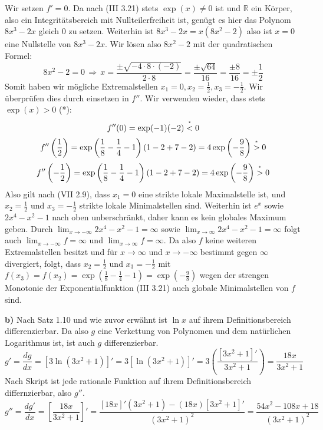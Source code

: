 \documentclass[a4paper,graphics,11pt]{article}
\newcommand{\up}[2]{\mathrel{\overset{\makebox[0pt]{\mbox{\normalfont\tiny #2}}}{#1}}}
\begin{document}
Wir setzen $f'=0$. Da nach (III 3.21) stets $\exp(x) \neq 0$ ist und $\mathbb{R}$ ein Körper,
also ein Integritätsbereich mit Nullteilerfreiheit ist, genügt es hier das Polynom
$8x^3-2x$ gleich 0 zu setzen. Weiterhin ist $8x^3-2x = x(8x^2-2)$ also ist $x=0$ eine
Nullstelle von $8x^3-2x$. Wir lösen also $8x^2-2$ mit der quadratischen Formel:
$$
    8x^2-2 = 0
    \,\Longrightarrow\, x = \frac{\pm\sqrt{-4\cdot8\cdot(-2)}}{2\cdot 8}
    = \frac{\pm \sqrt{64}}{16} = \frac{\pm8}{16} = \pm \frac{1}{2}
$$
Somit haben wir mögliche Extremalstellen $x_1 = 0, x_2 = \frac{1}{2}, x_3 = - \frac{1}{2}$.
Wir überprüfen dies durch einsetzen in $f''$. Wir verwenden wieder, dass stets $\exp(x) > 0$ (*):
$$
    f''(0) = \exp(-1)(-2) \up{<}{*} 0
$$$$
    f''\left(\frac{1}{2}\right)
    = \exp\left(\frac{1}{8}- \frac{1}{4} -1\right)\left(1- 2 + 7 - 2\right)
    = 4\exp\left(-\frac{9}{8}\right) \up{>}{*} 0
$$$$
     f''\left(-\frac{1}{2}\right)
    = \exp\left(\frac{1}{8}- \frac{1}{4} -1\right)\left(1- 2 + 7 - 2\right)
    = 4\exp\left(-\frac{9}{8}\right) \up{>}{*} 0
$$
Also gilt nach (VII 2.9), dass $x_1 = 0$ eine strikte lokale Maximalstelle ist,
und $x_2=\frac{1}{2}$ und $x_3 = - \frac{1}{2}$ strikte lokale Minimalstellen sind.
Weiterhin ist $e^x$ sowie $2x^4-x^2-1$ nach oben unberschränkt, daher kann es kein
globales Maximum geben. Durch $\lim_{x \to -\infty}\limits 2x^4-x^2-1 = \infty$ sowie
$\lim_{x \to \infty}\limits 2x^4-x^2-1 = \infty$ folgt auch $\lim_{x \to -\infty}\limits
f = \infty$ und $\lim_{x \to \infty}\limits f = \infty$. Da also $f$ keine weiteren
Extremalstellen besitzt und für $x\to \infty$ und $x\to -\infty$ bestimmt gegen $\infty$ 
divergiert, folgt, dass $x_2 = \frac{1}{2}$ und $x_3 = -\frac{1}{2}$
mit $f(x_3) = f(x_2) = \exp\left(\frac{1}{8}-\frac{1}{4} -1\right)
= \exp\left(-\frac{9}{8}\right)$ wegen der strengen Monotonie der Exponentialfunktion
(III 3.21) auch globale Minimalstellen von $f$ sind.

\textbf{b)}
Nach Satz 1.10 und wie zuvor erwähnt ist $\ln x$ auf ihrem Definitionsbereich differenzierbar. Da also $g$ eine
Verkettung von Polynomen und dem natürlichen Logarithmus ist, ist auch $g$ differenzierbar.
$$
    g' = \frac{dg}{dx} = [3\ln(3x^2+1)]'
    = 3[\ln(3x^2+1)]'
    = 3\left(\frac{[3x^2+1]'}{3x^2+1}\right)
    = \frac{18x}{3x^2+1}
$$
Nach Skript ist jede rationale Funktion auf ihrem Definitionsbereich differnzierbar, also $g''$.
$$
    g'' = \frac{dg'}{dx} = \left[\frac{18x}{3x^2+1}\right]'
    = \frac{[18x]'(3x^2+1)-(18x)[3x^2+1]'}{(3x^2+1)^2}
    = \frac{54x^2-108x+18}{(3x^2+1)^2}
$$
\end{document}

